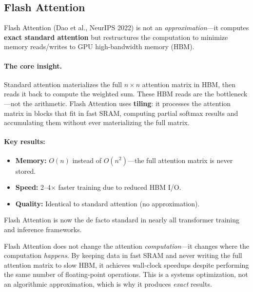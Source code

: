 \subsection{Flash Attention}

Flash Attention (Dao et al., NeurIPS 2022) is not an \emph{approximation}---it
computes \textbf{exact standard attention} but restructures the computation to
minimize memory reads/writes to GPU high-bandwidth memory (HBM).

\paragraph{The core insight.}
Standard attention materializes the full $n \times n$ attention matrix in HBM,
then reads it back to compute the weighted sum.  These HBM reads are the
bottleneck---not the arithmetic.  Flash Attention uses \textbf{tiling}: it
processes the attention matrix in blocks that fit in fast SRAM, computing
partial softmax results and accumulating them without ever materializing the
full matrix.

\paragraph{Key results:}
\begin{itemize}
    \item \textbf{Memory:} $O(n)$ instead of $O(n^2)$---the full attention
          matrix is never stored.
    \item \textbf{Speed:} 2--4$\times$ faster training due to reduced HBM
          I/O.
    \item \textbf{Quality:} Identical to standard attention (no approximation).
\end{itemize}

Flash Attention is now the de facto standard in nearly all transformer
training and inference frameworks.

\begin{keyinsight}
Flash Attention does not change the attention \emph{computation}---it changes
where the computation \emph{happens}.  By keeping data in fast SRAM and never
writing the full attention matrix to slow HBM, it achieves wall-clock speedups
despite performing the same number of floating-point operations.  This is a
systems optimization, not an algorithmic approximation, which is why it
produces \emph{exact} results.
\end{keyinsight}

